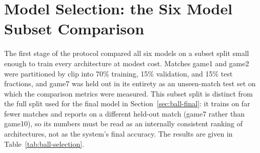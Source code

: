 \section{Model Selection: the Six Model Subset Comparison}
\label{sec:ball-selection}

The first stage of the protocol compared all six models on a subset split small
enough to train every architecture at modest cost. Matches game1 and game2 were
partitioned by clip into 70\% training, 15\% validation, and 15\% test
fractions, and game7 was held out in its entirety as an unseen-match test set on
which the comparison metrics were measured. This subset split is distinct from
the full split used for the final model in Section~\ref{sec:ball-final}: it
trains on far fewer matches and reports on a different held-out match (game7
rather than game10), so its numbers must be read as an internally consistent
ranking of architectures, not as the system's final accuracy. The results are
given in Table~\ref{tab:ball-selection}.

